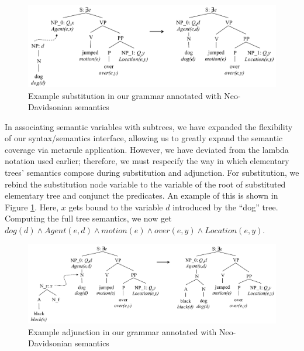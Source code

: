 \documentclass[11pt,a4paper]{article}
\begin{document}
\begin{figure}[h]
\begin{centering}
    \includegraphics[width= \linewidth ]{resources/ch5_resources/neo_substitution.pdf}
    \caption{Example substitution in our grammar annotated with Neo-Davidsonian semantics}
    \label{fig:neo_substitution}
\end{centering}
\end{figure}

In associating semantic variables with subtrees, we have expanded the flexibility of our syntax/semantics interface, allowing us to greatly expand the semantic coverage via metarule application. However, we have deviated from the lambda notation used earlier; therefore, we must respecify the way in which elementary trees' semantics compose during substitution and adjunction. For substitution, we rebind the substitution node variable to the variable of the root of substituted elementary tree and conjunct the predicates. An example of this is shown in Figure \ref{fig:neo_substitution}. Here, $x$ gets bound to the variable $d$ introduced by the ``dog'' tree. Computing the full tree semantics, we now get $dog(d) \land Agent(e,d) \land motion(e) \land over(e,y) \land Location(e,y)$. 

\begin{figure}[h]
\begin{centering}
    \includegraphics[width= \linewidth ]{resources/ch5_resources/neo_adjunction.pdf}
    \caption{Example adjunction in our grammar annotated with Neo-Davidsonian semantics}
    \label{fig:neo_adjunction}
\end{centering}
\end{figure}
\end{document}
